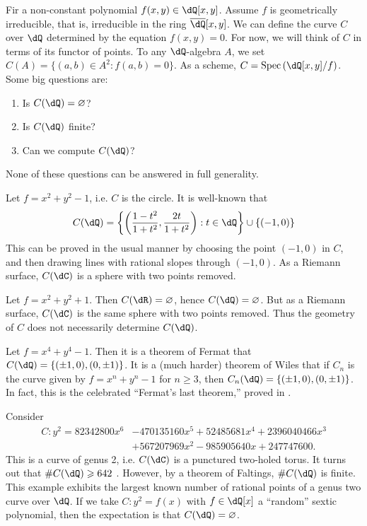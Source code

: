 \documentclass{article}
\begin{document}
Fir a non-constant polynomial $f(x,y)\in\dQ[x,y]$. Assume $f$ is 
geometrically irreducible, that is, irreducible in the ring 
$\overline{\dQ}[x,y]$. We can define the curve $C$ over $\dQ$ determined by the 
equation $f(x,y)=0$. For now, we will think of $C$ in terms of its functor of 
points. To any $\dQ$-algebra $A$, we set $C(A)=\{(a,b)\in A^2:f(a,b)=0\}$. 
As a scheme, $C=\spec\left(\dQ[x,y]/f\right)$. Some big questions are:
\begin{enumerate}
  \item Is $C(\dQ)=\varnothing$?
  \item Is $C(\dQ)$ finite?
  \item Can we compute $C(\dQ)$?
\end{enumerate}
None of these questions can be answered in full generality. 

\begin{example}
Let $f=x^2+y^2-1$, i.e. $C$ is the circle. It is well-known that 
\[
  C(\dQ)=\left\{\left(\frac{1-t^2}{1+t^2},\frac{2t}{1+t^2}\right):t\in\dQ\right\}\cup \{(-1,0)\}
\]
This can be proved in the usual manner by choosing the point $(-1,0)$ in $C$, 
and then drawing lines with rational slopes through $(-1,0)$. As a Riemann 
surface, $C(\dC)$ is a sphere with two points removed. 
\end{example}

\begin{example}
Let $f=x^2+y^2+1$. Then $C(\dR)=\varnothing$, hence $C(\dQ)=\varnothing$. But 
as a Riemann surface, $C(\dC)$ is the same sphere with two points removed. Thus 
the geometry of $C$ does not necessarily determine $C(\dQ)$. 
\end{example}

\begin{example}
Let $f=x^4+y^4-1$. Then it is a theorem of Fermat that 
$C(\dQ)=\{(\pm 1,0),(0,\pm 1)\}$. It is a (much harder) theorem of Wiles that if 
$C_n$ is the curve given by $f=x^n+y^n-1$ for $n\geqslant 3$, then 
$C_n(\dQ)=\{(\pm 1,0),(0,\pm 1)\}$. In fact, this is the celebrated 
``Fermat's last theorem,'' proved in \cite{wi95}. 
\end{example}

\begin{example}[Stoll]
Consider 
\begin{align*}
  C : y^2 = 82342800 x^6 &- 470135160 x^5 + 52485681 x^4 + 2396040466 x^3 \\
    &+ 567207969 x^2 - 985905640 x + 247747600 \text{.}
\end{align*}
This is a curve of genus 2, i.e. $C(\dC)$ is a punctured two-holed 
torus. It turns out that $\# C(\dQ)\geqslant 642$ \cite[\S 6]{st09}. 
However, by a theorem of Faltings, $\# C(\dQ)$ is finite. This example exhibits 
the largest known number of rational points of a genus two curve 
over $\dQ$. If we take $C:y^2=f(x)$ with $f\in\dQ[x]$ a 
``random'' sextic polynomial, then the expectation is that 
$C(\dQ)=\varnothing$. 
\end{example}
\end{document}

